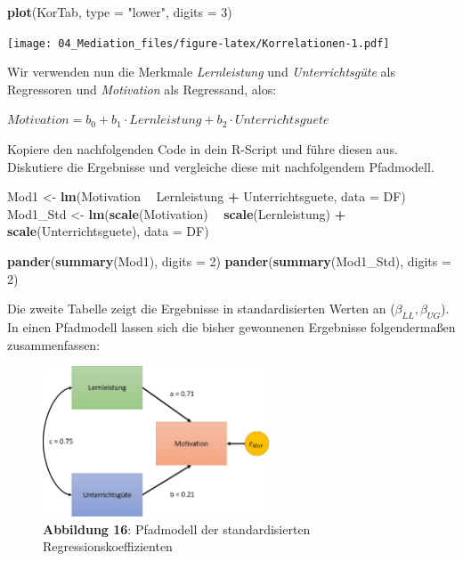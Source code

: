 \documentclass[]{article}
\newenvironment{Shaded}{\begin{snugshade}}{\end{snugshade}}
\newcommand{\DataTypeTok}[1]{\textcolor[rgb]{0.13,0.29,0.53}{#1}}
\newcommand{\DecValTok}[1]{\textcolor[rgb]{0.00,0.00,0.81}{#1}}
\newcommand{\KeywordTok}[1]{\textcolor[rgb]{0.13,0.29,0.53}{\textbf{#1}}}
\newcommand{\NormalTok}[1]{#1}
\newcommand{\OperatorTok}[1]{\textcolor[rgb]{0.81,0.36,0.00}{\textbf{#1}}}
\newcommand{\StringTok}[1]{\textcolor[rgb]{0.31,0.60,0.02}{#1}}
\begin{document}
\begin{Shaded}
\begin{Highlighting}[]
    \KeywordTok{plot}\NormalTok{(KorTab, }\DataTypeTok{type =} \StringTok{"lower"}\NormalTok{, }\DataTypeTok{digits =} \DecValTok{3}\NormalTok{)}
\end{Highlighting}
\end{Shaded}

\texttt{[image: 04\_Mediation\_files/figure-latex/Korrelationen-1.pdf]}

Wir verwenden nun die Merkmale \emph{Lernleistung} und \emph{Unterrichtsgüte} als Regressoren und \emph{Motivation} als Regressand, alos:

\(Motivation = b_0 + b_1 \cdot Lernleistung + b_2 \cdot Unterrichtsguete\)

Kopiere den nachfolgenden Code in dein R-Script und führe diesen aus. Diskutiere die Ergebnisse und vergleiche diese mit nachfolgendem Pfadmodell.

\begin{Shaded}
\begin{Highlighting}[]
\NormalTok{    Mod1     <-}\StringTok{ }\KeywordTok{lm}\NormalTok{(Motivation }\OperatorTok{~}\StringTok{ }\NormalTok{Lernleistung }\OperatorTok{+}\StringTok{ }\NormalTok{Unterrichtsguete, }\DataTypeTok{data =}\NormalTok{ DF)}
\NormalTok{    Mod1_Std <-}\StringTok{ }\KeywordTok{lm}\NormalTok{(}\KeywordTok{scale}\NormalTok{(Motivation) }\OperatorTok{~}\StringTok{ }\KeywordTok{scale}\NormalTok{(Lernleistung) }\OperatorTok{+}\StringTok{ }
\StringTok{                                       }\KeywordTok{scale}\NormalTok{(Unterrichtsguete), }
                                       \DataTypeTok{data =}\NormalTok{ DF)}
    
    \KeywordTok{pander}\NormalTok{(}\KeywordTok{summary}\NormalTok{(Mod1), }\DataTypeTok{digits =} \DecValTok{2}\NormalTok{)}
    \KeywordTok{pander}\NormalTok{(}\KeywordTok{summary}\NormalTok{(Mod1_Std), }\DataTypeTok{digits =} \DecValTok{2}\NormalTok{)}
\end{Highlighting}
\end{Shaded}

Die zweite Tabelle zeigt die Ergebnisse in standardisierten Werten an (\(\beta_{LL}, \beta_{UG}\)). In einen Pfadmodell lassen sich die bisher gewonnenen Ergebnisse folgendermaßen zusammenfassen:

\begin{figure}
\centering
\includegraphics[width=0.6\textwidth,height=\textheight]{Images/Pfadanalyse_Modell1.jpg}
\caption{\textbf{Abbildung 16}: Pfadmodell der standardisierten Regressionskoeffizienten}
\end{figure}
\end{document}
